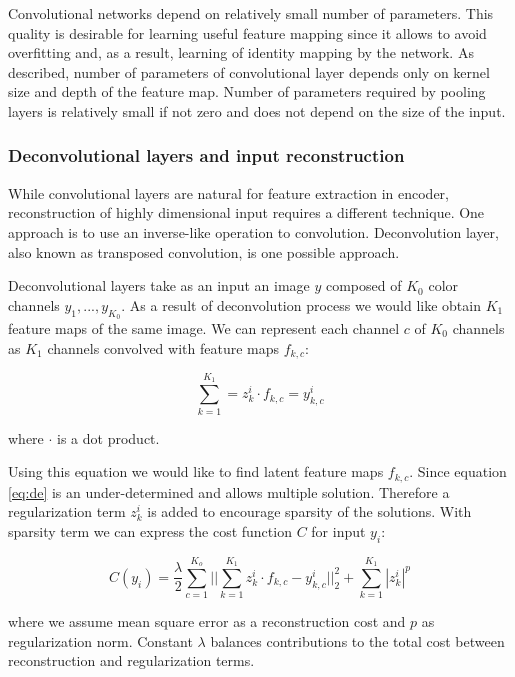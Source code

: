 Convolutional networks depend on relatively small number of parameters.
This quality is desirable for learning useful feature mapping since it allows to avoid overfitting and, as a result, learning of identity mapping by the network.
As described, number of parameters of convolutional layer depends only on kernel size and depth of the feature map.
Number of parameters required by pooling layers is relatively small if not zero and does not depend on the size of the input.

\subsubsection{Deconvolutional layers and input reconstruction}

While convolutional layers are natural for feature extraction in encoder, reconstruction of highly dimensional input requires a different technique.
One approach is to use an inverse-like operation to convolution.
Deconvolution layer, also known as transposed convolution, is one possible approach.

Deconvolutional layers \cite{Zeiler2010} take as an input an image $y$ composed of $K_0$ color channels $y_1, ... , y_{K_0}$.
As a result of deconvolution process we would like obtain $K_1$ feature maps of the same image.
We can represent each channel $c$ of $K_0$ channels as $K_1$ channels convolved with feature maps $f_{k,c}$:

\begin{equation}\label{eq:de}
  \sum^{K_1}_{k=1}=z^i_k \cdot f_{k,c} = y^i_{k,c}
\end{equation}

where $\cdot$ is a dot product.

Using this equation we would like to find latent feature maps $f_{k,c}$.
Since equation \ref{eq:de} is an under-determined and allows multiple solution.
Therefore a regularization term $z^i_k$ is added to encourage sparsity of the solutions.
With sparsity term we can express the cost function $C$ for input $y_i$:

\begin{equation}\label{eq:dec}
    C(y_i) = \frac{\lambda}{2} \sum^{K_o}_{c=1} ||\sum^{K_1}_{k=1}{z^i_k \cdot f_{k,c} - y^i_{k,c}}||^2_2 + \sum^{K_1}_{k=1}{|z^i_k|^p}
\end{equation}

where we assume mean square error as a reconstruction cost and $p$ as regularization norm.
Constant $\lambda$ balances contributions to the total cost between reconstruction and regularization terms.


